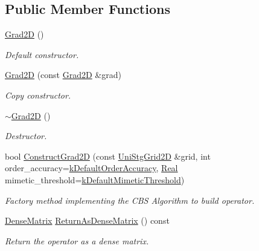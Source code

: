 \subsection*{Public Member Functions}
\begin{DoxyCompactItemize}
\item 
\hyperlink{classmtk_1_1Grad2D_a15bdca254b7bf662913b34c7afb8d4c9}{Grad2\+D} ()
\begin{DoxyCompactList}\small\item\em Default constructor. \end{DoxyCompactList}\item 
\hyperlink{classmtk_1_1Grad2D_a31ccf118edb128c85f28b579bd9394a8}{Grad2\+D} (const \hyperlink{classmtk_1_1Grad2D}{Grad2\+D} \&grad)
\begin{DoxyCompactList}\small\item\em Copy constructor. \end{DoxyCompactList}\item 
\hyperlink{classmtk_1_1Grad2D_ae6a071b24422d057c41346e80be96cb3}{$\sim$\+Grad2\+D} ()
\begin{DoxyCompactList}\small\item\em Destructor. \end{DoxyCompactList}\item 
bool \hyperlink{classmtk_1_1Grad2D_a9771be954c59880e3d83f4d645378c00}{Construct\+Grad2\+D} (const \hyperlink{classmtk_1_1UniStgGrid2D}{Uni\+Stg\+Grid2\+D} \&grid, int order\+\_\+accuracy=\hyperlink{group__c01-roots_ga0d95560098eb36420511103637b6952f}{k\+Default\+Order\+Accuracy}, \hyperlink{group__c01-roots_gac080bbbf5cbb5502c9f00405f894857d}{Real} mimetic\+\_\+threshold=\hyperlink{group__c01-roots_ga35718d949bdc81a08a9cc8ebbe3478a2}{k\+Default\+Mimetic\+Threshold})
\begin{DoxyCompactList}\small\item\em Factory method implementing the C\+B\+S Algorithm to build operator. \end{DoxyCompactList}\item 
\hyperlink{classmtk_1_1DenseMatrix}{Dense\+Matrix} \hyperlink{classmtk_1_1Grad2D_a4f5a17519455f833bb70b8434c272312}{Return\+As\+Dense\+Matrix} () const 
\begin{DoxyCompactList}\small\item\em Return the operator as a dense matrix. \end{DoxyCompactList}\end{DoxyCompactItemize}
